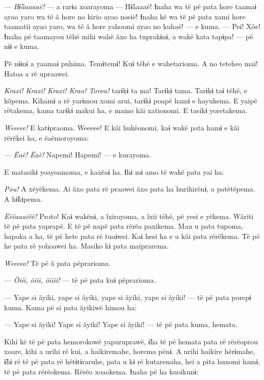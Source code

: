 --- \textit{Hɨ̃ãaaaaë! }--- a rarɨa xoarayoma --- Hɨ̃ãaaaë! Ɨnaha wa të pë pata
 hore taamaɨ ayao yaro wa të ã hore no kirio ayao nosië! Ɨnaha kë wa të
 pë pata xami hore taamatii ayao yaro, wa të ã hore yahoomi ayao no
 kuhaë! --- e kuma. --- Pei! Xõe! Ɨnaha pë taamayou tëhë mihi wahë ãxo ha
 tuprakɨnɨ, a wakë kata tapɨpa! --- pë nɨɨ e kuma. 

Pë nɨɨnɨ a yaamaɨ puhima. Temɨtemɨ! Kuɨ tëhë e wahetarioma. A no teteheo
mai! Hatoa a rë upraawei. 

\textit{Kraxi! Kraxi! Kraxi! Krao! Torou!} tarɨkɨ ta ma! Tarɨkɨ tama. Tarɨkɨ taɨ
tëhë, e kõpema. Kihamɨ a rë yarɨmou xomi arui, tarɨkɨ poapë hamɨ e
hayukema. E yaipë rëtakema, kama tarɨkɨ makui ha, e mamo kãi xationomi.
E tasikɨ yoretakema. 



\textit{Weeeee!} E katɨpraoma. Weeeee! E kãi hukëonomi, kaɨ wakë pata hamɨ e kãi
rërëkei ha, e ëaëmorayoma:

--- \textit{Ëaë! Ëaë!} Napemi! Hapemi! --- e kurayoma. 

E matasikɨ yoayoamoma, e kaxëaɨ ha. Ɨhɨ mɨ amo të wakë pata yai ha: 

\textit{Pou!} A xëyëkema. Ai ãxo pata rë praawei ãxo pata ha hurihirënɨ, a
patëtëpema. A hɨ̃kɨpema. 

\textit{Ëëëaaaëëë!} Proto! Kaɨ wakënɨ, a ĩxirayoma, a ĩxii tëhë, pë yesi e
yëkema. Wãriti të pë pata yaprapë. E të pë napë pata rërëa paxikema. Mau
u pata tupoma, hapoka a ha, të pë hete pata rë tuaɨwei. Kaɨ hesi ha e u
kãi pata rërëkema. Të pë he pata rë yohoawei ha. Masiko kɨ pata
maiprarema. 

\textit{Weeeeo!} Të pë ã pata pëprarioma. 

--- \textit{Õiii, õiii, õiiii!} --- të pë pata kuɨ pëprarioma.

--- Yape si ãyiki, yape si ãyiki, yape si ãyiki, yape si ãyiki! --- të
pë pata porepɨ kuma. Kama pë si pata ãyikiwë himou ha: 

--- Yape si ãyiki! Yape si ãyiki! Yape si ãyiki! --- të pë pata kuma,
hemata. 

Kihi kë të pë pata hemorokowë yapuruprawë, ɨ̃ha të pë hemata pata rë
rërëoprou xoare, kihi a urihi rë kui, a haikiremahe, horema pënɨ. A urihi haikire hërɨmahe, ɨ̃hɨ rë të pë pata rë hëtɨtɨraruhe, pata u kɨ rë
kutarenaha, hei a pita huxomi hamɨ, të pë pata rërëokema. Rërëo
xoaokema. Ɨnaha pë ha kuoikunɨ: 

